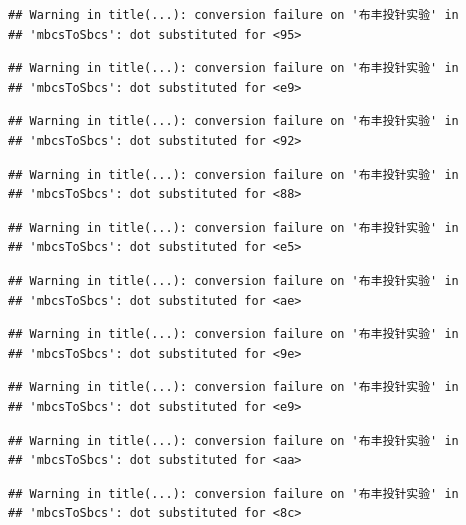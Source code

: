 \documentclass[]{article}
\begin{document}
\begin{verbatim}
## Warning in title(...): conversion failure on '布丰投针实验' in
## 'mbcsToSbcs': dot substituted for <95>
\end{verbatim}

\begin{verbatim}
## Warning in title(...): conversion failure on '布丰投针实验' in
## 'mbcsToSbcs': dot substituted for <e9>
\end{verbatim}

\begin{verbatim}
## Warning in title(...): conversion failure on '布丰投针实验' in
## 'mbcsToSbcs': dot substituted for <92>
\end{verbatim}

\begin{verbatim}
## Warning in title(...): conversion failure on '布丰投针实验' in
## 'mbcsToSbcs': dot substituted for <88>
\end{verbatim}

\begin{verbatim}
## Warning in title(...): conversion failure on '布丰投针实验' in
## 'mbcsToSbcs': dot substituted for <e5>
\end{verbatim}

\begin{verbatim}
## Warning in title(...): conversion failure on '布丰投针实验' in
## 'mbcsToSbcs': dot substituted for <ae>
\end{verbatim}

\begin{verbatim}
## Warning in title(...): conversion failure on '布丰投针实验' in
## 'mbcsToSbcs': dot substituted for <9e>
\end{verbatim}

\begin{verbatim}
## Warning in title(...): conversion failure on '布丰投针实验' in
## 'mbcsToSbcs': dot substituted for <e9>
\end{verbatim}

\begin{verbatim}
## Warning in title(...): conversion failure on '布丰投针实验' in
## 'mbcsToSbcs': dot substituted for <aa>
\end{verbatim}

\begin{verbatim}
## Warning in title(...): conversion failure on '布丰投针实验' in
## 'mbcsToSbcs': dot substituted for <8c>
\end{verbatim}
\end{document}
